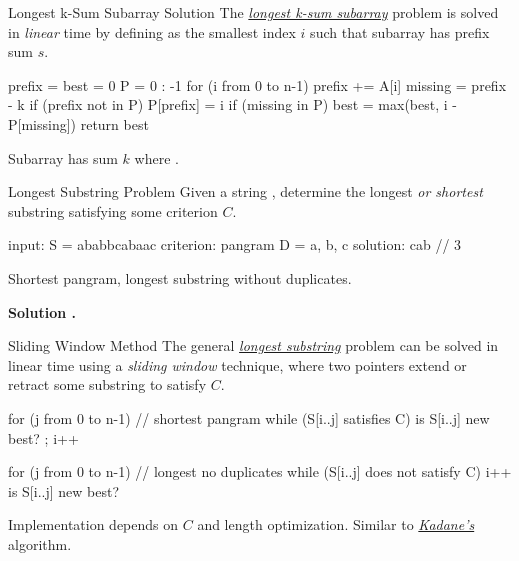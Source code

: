 \documentclass{cognito}
\begin{document}
\begin{note}{Longest k-Sum Subarray Solution}
	The \hyperref[note:Longest k-Sum Subarray]{\it longest k-sum subarray} problem is solved in \emph{linear} time
	by defining  as the smallest index $i$ such that subarray  has prefix sum $s$.
	
	\begin{largecode}
 prefix = best = 0
 P = {0 : -1}
 for (i from 0 to n-1)
 	prefix += A[i]
	missing = prefix - k
	if (prefix not in P) P[prefix] = i
	if (missing in P) best = max(best, i - P[missing])
 return best
	\end{largecode}
	\begin{remark} Subarray  has sum $k$ where .
	\end{remark}\vspace{-5pt}
\end{note}

\begin{note}{Longest Substring Problem}
	Given a string , determine the longest \emph{or shortest} substring  satisfying some criterion $C$.
	\begin{largecode}
 input: S = ababbcabaac
 criterion: pangram D = {a, b, c}
 solution: cab  // 3
	\end{largecode}	
	\vspace{-5pt}
	\begin{example} Shortest pangram, longest substring without duplicates. \end{example}
	\vspace{5pt}
	\bf Solution \hyperref[note:Sliding Window Method]{\solutionref}.
\end{note}

\begin{note}{Sliding Window Method}
	The general \hyperref[note:Longest Substring Problem]{\it longest substring} problem can be solved in linear time using a
	\emph{sliding window} technique, where two pointers extend or retract some substring  to satisfy $C$.
	\begin{largecode}
 for (j from 0 to n-1)     // shortest pangram
 	while (S[i..j] satisfies C)
		is S[i..j] new best? ; i++
	\end{largecode}
	\vspace{-5pt}
	\begin{largecode}
 for (j from 0 to n-1)     // longest no duplicates
 	while (S[i..j] does not satisfy C) i++
	is S[i..j] new best?
	\end{largecode}
	\begin{remark} Implementation depends on $C$ and length optimization.
		Similar to \hyperref[note:Kadane's Algorithm]{\it Kadane's} algorithm.
	\end{remark}
	\vspace{-5pt}
\end{note}
\end{document}
